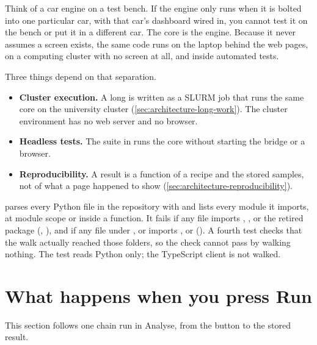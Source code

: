 \begin{plainterms}
Think of a car engine on a test bench. If the engine only runs when it is bolted into one particular
car, with that car's dashboard wired in, you cannot test it on the bench or put it in a different car.
The core is the engine. Because it never assumes a screen exists, the same code runs on the laptop
behind the web pages, on a computing cluster with no screen at all, and inside automated tests.
\end{plainterms}

Three things depend on that separation.
\begin{itemize}
\item \textbf{Cluster execution.} A long  is written as a SLURM job that runs
  the same core on the university cluster (\cref{sec:architecture-long-work}). The cluster
  environment has no web server and no browser.
\item \textbf{Headless tests.} The  suite in  runs the core without
  starting the bridge or a browser.
\item \textbf{Reproducibility.} A result is a function of a recipe and the stored samples, not of
  what a page happened to show (\cref{sec:architecture-reproducibility}).
\end{itemize}

\begin{underthehood}
 parses every Python file in the repository with 
and lists every module it imports, at module scope or inside a function. It fails if any file
imports , ,  or the retired  package
(,
), and if any file under
,  or  imports ,  or
 (). A fourth test checks
that the walk actually reached those folders, so the check cannot pass by walking nothing. The test
reads Python only; the TypeScript client is not walked.
\end{underthehood}

\section{What happens when you press Run}\label{sec:architecture-run}
This section follows one chain run in Analyse, from the button to the stored result.

